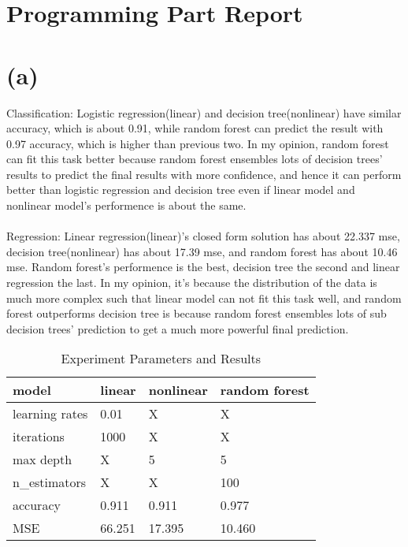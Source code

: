 \documentclass[12pt,a4paper]{article}
\begin{document}
\section*{Programming Part Report}
\section*{(a)}
Classification: Logistic regression(linear) and decision tree(nonlinear) have similar accuracy, which is about 0.91, while random forest
can predict the result with 0.97 accuracy, which is higher than previous two. In my opinion, random forest can fit this task better because random forest ensembles
lots of decision trees' results to predict the final results with more confidence, and hence it can perform better than logistic regression and decision tree even if
linear model and nonlinear model's performence is about the same.\\
\\
Regression: Linear regression(linear)'s closed form solution has about 22.337 mse, decision tree(nonlinear) has about 17.39 mse, and random forest has about 10.46 mse.
Random forest's performence is the best, decision tree the second and linear regression the last. In my opinion, it's because the distribution of the data is much more complex
such that linear model can not fit this task well, and random forest outperforms decision tree is because random forest ensembles lots of sub decision trees' prediction to
get a much more powerful final prediction.\\
\begin{table}[htbp]
    \centering
    \caption{Experiment Parameters and Results}
    \label{label1}
    \begin{tabular}[t]{llll}
    \hline
    model & linear & nonlinear & random forest \\
    \hline
    learning rates & 0.01   & X   & X \\
    iterations & 1000   & X   & X \\
    max depth & X   & 5   & 5 \\
    n\_estimators & X   & X   & 100 \\
    accuracy & 0.911   & 0.911   & 0.977 \\
    MSE & 66.251   & 17.395   & 10.460 \\
    \hline
    \end{tabular}
\end{table}
\newpage
\end{document}
